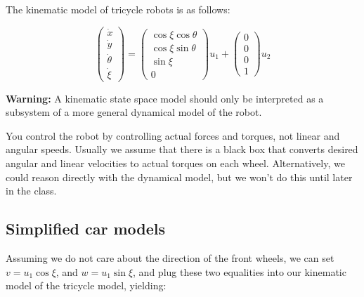 \documentclass[twoside]{article}
\begin{document}
The kinematic model of tricycle robots is as follows:

\[ \begin{pmatrix}
\dot{x} \\ \dot{y} \\ \dot{\theta} \\ \dot{\xi}
\end{pmatrix} =
\begin{pmatrix} \cos \xi \cos \theta \\ \cos \xi \sin \theta \\ \sin \xi \\ 0 \end{pmatrix} u_1 + \begin{pmatrix} 0 \\ 0 \\ 0 \\ 1 \end{pmatrix} u_2
\]

\textbf{Warning:} A kinematic state space model should only be interpreted as a subsystem of a more general dynamical model of the robot.

You control the robot by controlling actual forces and torques, not linear and angular speeds. Usually we assume that there is a black box that converts desired angular and linear velocities to actual torques on each wheel. Alternatively, we could reason directly with the dynamical model, but we won't do this until later in the class.

\subsection*{Simplified car models}

Assuming we do not care about the direction of the front wheels, we can set $v = u_1 \cos \xi$, and $w = u_1 \sin \xi$, and plug these two equalities into our kinematic model of the tricycle model, yielding:
\end{document}
